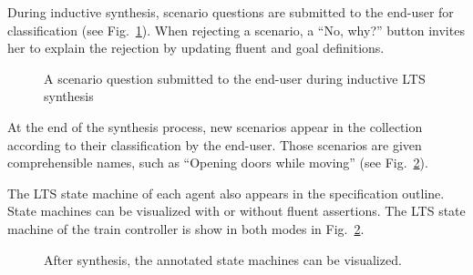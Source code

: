 During inductive synthesis, scenario questions are submitted to the end-user for classification (see Fig.~\ref{image:isis-tool-scenario-question}). When rejecting a scenario, a ``No, why?'' button invites her to explain the rejection by updating fluent and goal definitions. 

\begin{figure}[H]
\centering{}
  \caption{A scenario question submitted to the end-user during inductive LTS synthesis\label{image:isis-tool-scenario-question}}
\end{figure}

At the end of the synthesis process, new scenarios appear in the collection according to their classification by the end-user. Those scenarios are given comprehensible names, such as ``Opening doors while moving'' (see Fig.~\ref{image:isis-after}). 

The LTS state machine of each agent also appears in the specification outline. State machines can be visualized with or without fluent assertions. The LTS state machine of the train controller is show in both modes in Fig.~\ref{image:isis-after}. 

\begin{figure}[H]
\centering{}
  \caption{After synthesis, the annotated state machines can be visualized.\label{image:isis-after}}
\end{figure}

